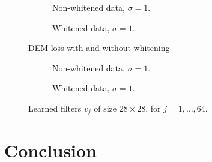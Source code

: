 \documentclass[a4paper]{article}
\theoremstyle{definition}
\theoremstyle{plain}
\begin{document}
\begin{figure}[H]
	\centering
	\begin{subfigure}[b]{0.49\textwidth}
		
		\caption{Non-whitened data, $\sigma = 1$.}
	\end{subfigure}
	\hfill
	\begin{subfigure}[b]{0.49\textwidth}
		
		\caption{Whitened data, $\sigma=1$.}
	\end{subfigure}
	\caption{DEM loss with and without whitening}
	\label{loss_DEM}
\end{figure}


\begin{figure}[H]
\centering
	\begin{subfigure}[b]{0.49\textwidth}
		\centering
		
		\caption{Non-whitened data, $\sigma = 1$.}
	\end{subfigure}
	\hfill
	\begin{subfigure}[b]{0.49\textwidth}
	\centering
		
		\caption{Whitened data, $\sigma = 1$.}
	\end{subfigure}
	\caption{Learned filters $v_j$ of size $28\times28$, for $j = 1,\ldots,64$.}
\end{figure}




\section*{\center Conclusion}
\end{document}
